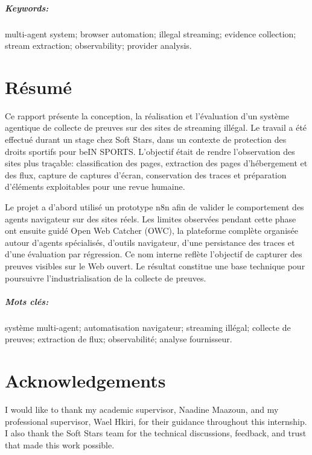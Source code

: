 \documentclass[12pt,a4paper,twoside]{report}
\newcommand{\supervisorName}{Naadine Maazoun}
\newcommand{\industrySupervisorName}{Wael Hkiri}
\begin{document}
\paragraph*{Keywords:} multi-agent system; browser automation; illegal streaming; evidence collection; stream extraction; observability; provider analysis.

\chapter*{R\'esum\'e}
Ce rapport pr\'esente la conception, la r\'ealisation et l'\'evaluation d'un syst\`eme agentique de collecte de preuves sur des sites de streaming ill\'egal. Le travail a \'et\'e effectu\'e durant un stage chez Soft Stars, dans un contexte de protection des droits sportifs pour beIN SPORTS. L'objectif \'etait de rendre l'observation des sites plus tra\c{c}able: classification des pages, extraction des pages d'h\'ebergement et des flux, capture de captures d'\'ecran, conservation des traces et pr\'eparation d'\'el\'ements exploitables pour une revue humaine.

Le projet a d'abord utilis\'e un prototype n8n afin de valider le comportement des agents navigateur sur des sites r\'eels. Les limites observ\'ees pendant cette phase ont ensuite guid\'e Open Web Catcher (OWC), la plateforme compl\`ete organis\'ee autour d'agents sp\'ecialis\'es, d'outils navigateur, d'une persistance des traces et d'une \'evaluation par r\'egression. Ce nom interne refl\`ete l'objectif de capturer des preuves visibles sur le Web ouvert. Le r\'esultat constitue une base technique pour poursuivre l'industrialisation de la collecte de preuves.

\paragraph*{Mots cl\'es:} syst\`eme multi-agent; automatisation navigateur; streaming ill\'egal; collecte de preuves; extraction de flux; observabilit\'e; analyse fournisseur.

\chapter*{Acknowledgements}
I would like to thank my academic supervisor, \supervisorName, and my professional supervisor, \industrySupervisorName, for their guidance throughout this internship. I also thank the Soft Stars team for the technical discussions, feedback, and trust that made this work possible.
\end{document}
